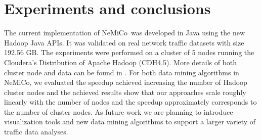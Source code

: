 \documentclass[conference]{IEEEtran}
\newcommand{\Nemico}{{\sc NeMiCo}}
\begin{document}


\section{Experiments and conclusions}
\label{conc}

The current implementation of \Nemico\ was developed in Java using the new Hadoop Java APIs. It was validated on real network traffic datasets with size 192.56 GB. The experiments were performed on a cluster of 5 nodes running the Cloudera's
Distribution of Apache Hadoop (CDH4.5). More details of both cluster node and data can be found in \cite{ISPA14}. 
For both data mining algorithms in \Nemico , we evaluated the speedup achieved increasing the number of Hadoop cluster nodes and the achieved results show that our approaches scale roughly linearly with the number of nodes and the speedup approximately
corresponds to the number of cluster nodes. As future work we are planning to introduce visualization tools and new data mining algorithms to support
a larger variety of traffic data analyses. 
\end{document}
